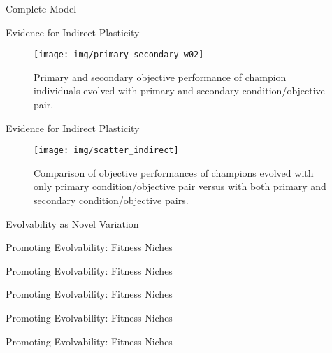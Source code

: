 \begin{frame}{Complete Model}

\end{frame}


\begin{frame}{Evidence for Indirect Plasticity}
\begin{figure}
    \centering
    \texttt{[image: img/primary\_secondary\_w02]}
 	\captionsetup{singlelinecheck=off,justification=raggedright}
  	\caption{Primary and secondary objective performance of champion individuals evolved with primary and secondary condition/objective pair.}
    \label{fig:ev_w0}
\end{figure}
\end{frame}

\begin{frame}{Evidence for Indirect Plasticity}
\begin{figure}
    \centering
    \texttt{[image: img/scatter\_indirect]}
 	\captionsetup{singlelinecheck=off,justification=raggedright}
  	\caption{Comparison of objective performances of champions evolved with only primary condition/objective pair versus with both primary and secondary condition/objective pairs.}
    \label{fig:es_p0}
\end{figure}
\end{frame}

\begin{frame}{Evolvability as Novel Variation}
  
\end{frame}

\begin{frame}{Promoting Evolvability: Fitness Niches}
	
\end{frame}

\begin{frame}{Promoting Evolvability: Fitness Niches}
\vfill
	
    \vfill
\end{frame}

\begin{frame}{Promoting Evolvability: Fitness Niches}
\vspace{2ex}
	
\end{frame}

\begin{frame}{Promoting Evolvability: Fitness Niches}
\vspace{2ex}	

\end{frame}

\begin{frame}{Promoting Evolvability: Fitness Niches}
	
\end{frame}
